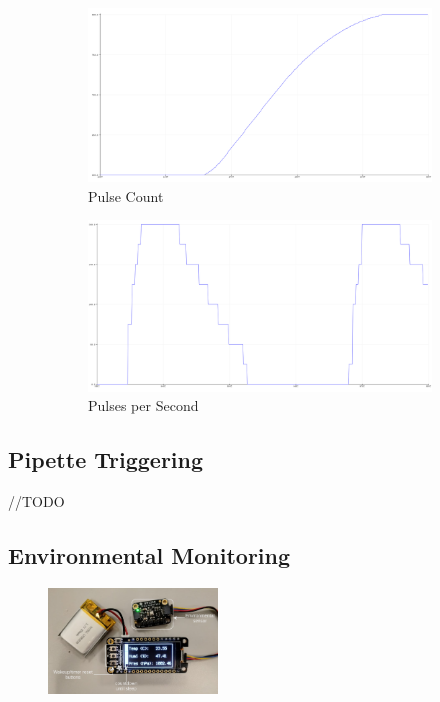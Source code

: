 \begin{figure}[h]
    \centering
    \begin{subfigure}{.45\textwidth}
        \centering
        \includegraphics[width=0.8\linewidth]{img/stepper_pulses.PNG}
        \caption{Pulse Count}
    \end{subfigure}%
    \begin{subfigure}{.45\textwidth}
        \centering
        \includegraphics[width=0.8\linewidth]{img/stepper_pulse_acc.PNG}
        \caption{Pulses per Second}
    \end{subfigure}
    \caption{}
    \label{fig:code}
\end{figure}

\subsection{Pipette Triggering}
//TODO
\subsection{Environmental Monitoring}

\begin{figure}
    \centering
    \includegraphics[width=0.4\textwidth]{img/env_mon.png}
\end{figure}